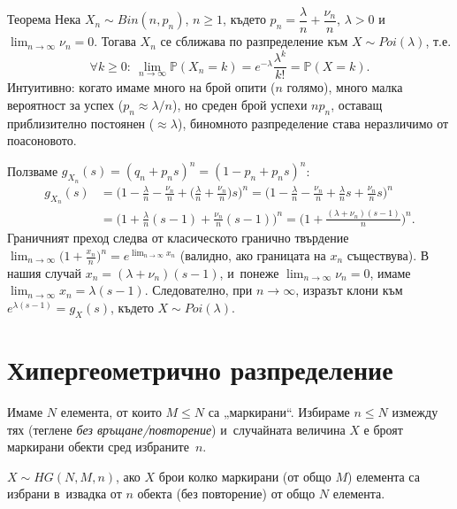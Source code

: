 \begin{thmbox}[~(на Поасон)]{Теорема}
Нека $X_n\sim Bin(n,p_n)$, $n\ge1$, където $p_n=\dfrac{\lambda}{n}+
\dfrac{\nu_n}{n}$, $\lambda>0$ и~$\lim_{n\to\infty}\nu_n=0$. Тогава
$X_n$ се сближава по разпределение към $X\sim Poi(\lambda)$, т.е.
\[
  \forall k\ge0:\ \lim_{n\to\infty}\mathbb P(X_n=k) = e^{-\lambda}\frac{\lambda^k}{k!} = \mathbb P(X=k).
\]
Интуитивно: когато имаме много на брой опити ($n$ голямо), много
малка вероятност за успех ($p_n\approx\lambda/n$), но среден брой
успехи $np_n$, оставащ приблизително постоянен ($\approx\lambda$),
биномното разпределение става неразличимо от поасоновото.
\end{thmbox}

\begin{proofbox}
Ползваме $g_{X_n}(s) = (q_n+p_ns)^n = (1-p_n+p_ns)^n$:
\begin{align*}
  g_{X_n}(s) &= \Big(1-\frac{\lambda}{n}-\frac{\nu_n}{n}+\Big(\frac{\lambda}{n}+\frac{\nu_n}{n}\Big)s\Big)^n
  = \Big(1-\frac{\lambda}{n}-\frac{\nu_n}{n}+\frac{\lambda}{n}s+\frac{\nu_n}{n}s\Big)^n\\
  &= \Big(1+\frac{\lambda}{n}(s-1)+\frac{\nu_n}{n}(s-1)\Big)^n
  = \Big(1+\frac{(\lambda+\nu_n)(s-1)}{n}\Big)^n.
\end{align*}
Граничният преход следва от класическото гранично твърдение
$\lim_{n\to\infty}\big(1+\tfrac{x_n}{n}\big)^n = e^{\lim_{n\to\infty}x_n}$
(валидно, ако границата на $x_n$ съществува). В нашия случай
$x_n=(\lambda+\nu_n)(s-1)$, и~понеже $\lim_{n\to\infty}\nu_n=0$,
имаме $\lim_{n\to\infty}x_n = \lambda(s-1)$. Следователно, при
$n\to\infty$, изразът клони към $e^{\lambda(s-1)}=g_X(s)$, където
$X\sim Poi(\lambda)$. \qedbg
\end{proofbox}

\section{Хипергеометрично разпределение}

\begin{rembox}[Постановка]
Имаме $N$ елемента, от които $M\le N$ са „маркирани“. Избираме
$n\le N$ измежду тях (теглене \emph{без връщане/повторение}) и~случайната величина $X$ е броят маркирани обекти сред избраните~$n$.
\end{rembox}

\begin{defbox}
$X\sim HG(N,M,n)$, ако $X$ брои колко маркирани (от общо $M$)
елемента са избрани в~извадка от $n$ обекта (без повторение) от общо
$N$ елемента.
\end{defbox}

